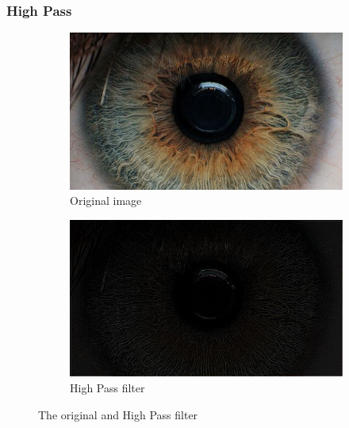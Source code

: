 \documentclass{article}
\begin{document}
\subsubsection{High Pass}




\begin{figure}[H]
\centering

\begin{subfigure}{.5\textwidth}
  \centering
  \includegraphics[width=0.9\linewidth]{res/index.jpg}
  \caption{Original image}
  \label{fig:original_img}
\end{subfigure}%
\begin{subfigure}{.5\textwidth}
  \centering
  \includegraphics[width=0.9\linewidth]{res/high_pass.jpg}
  \caption{High Pass filter}
  \label{fig:gray_img}
\end{subfigure}

\caption{The original and High Pass filter}
\label{fig:result_high}
\end{figure}
\end{document}
